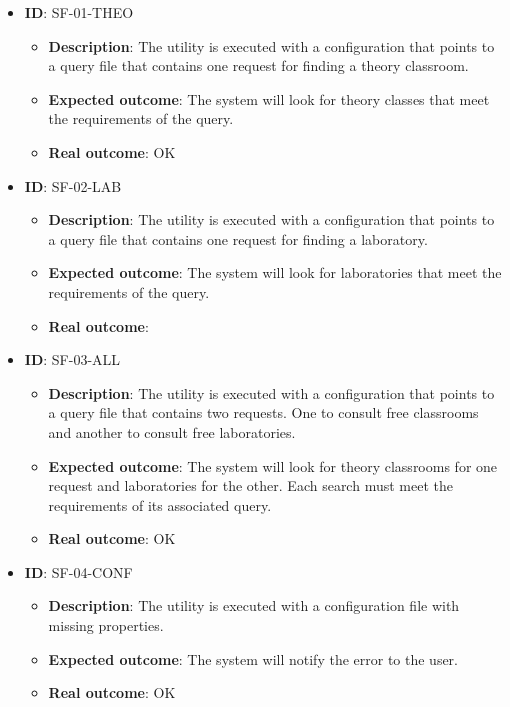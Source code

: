\begin{itemize}
    \item \textbf{ID}: SF-01-THEO
        \begin{itemize}
            \item \textbf{Description}: The utility is executed with a configuration that points to a query file that contains one request for finding a theory classroom.
            \item \textbf{Expected outcome}: The system will look for theory classes that meet the requirements of the query.
            \item \textbf{Real outcome}: OK
        \end{itemize}
    \item \textbf{ID}: SF-02-LAB
        \begin{itemize}
            \item \textbf{Description}: The utility is executed with a configuration that points to a query file that contains one request for finding a laboratory.
            \item \textbf{Expected outcome}: The system will look for laboratories that meet the requirements of the query.
            \item \textbf{Real outcome}:
        \end{itemize}
    \item \textbf{ID}: SF-03-ALL
        \begin{itemize}
            \item \textbf{Description}: The utility is executed with a configuration that points to a query file that contains two requests. One to consult free classrooms and another to consult free laboratories. 
            \item \textbf{Expected outcome}: The system will look for theory classrooms for one request and laboratories for the other. Each search must meet the requirements of its associated query.
            \item \textbf{Real outcome}: OK
        \end{itemize}
    \item \textbf{ID}: SF-04-CONF
        \begin{itemize}
            \item \textbf{Description}: The utility is executed with a configuration file with missing properties.
            \item \textbf{Expected outcome}: The system will notify the error to the user.
            \item \textbf{Real outcome}: OK

\end{itemize}
\end{itemize}
